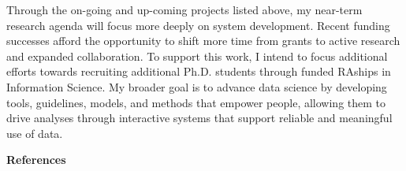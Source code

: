 \documentclass[11pt]{article}
\begin{document}
Through the on-going and up-coming projects listed above, my near-term research agenda will focus more deeply on system development. Recent funding successes afford the opportunity to shift more time from grants to active research and expanded collaboration.
To support this work, I intend to focus additional efforts towards recruiting additional Ph.D. students through funded RAships in Information Science.  
My broader goal 
is to advance 
data science by developing tools, guidelines, models, and methods that empower people, allowing them to drive analyses through interactive systems that support reliable and meaningful use of data.

\pagebreak
{
\vspace{4pt}
\noindent
\textbf{References}
\vspace{-24pt}
\renewcommand\refname{\vskip -1cm}
\small


}


\pagebreak
\setcounter{page}{1}
\end{document}
